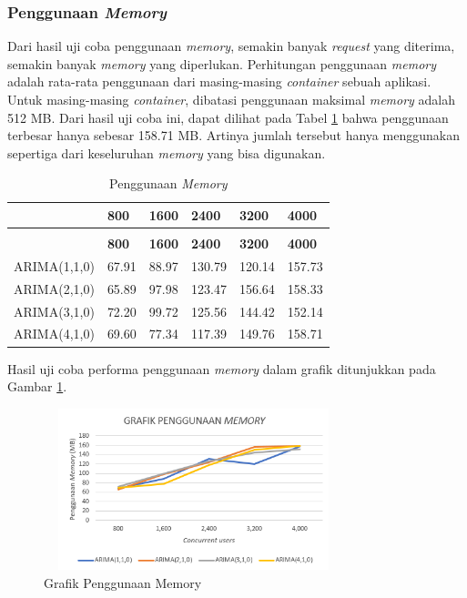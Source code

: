 \subsubsection{Penggunaan \textit{Memory}}            
Dari hasil uji coba penggunaan \textit{memory}, semakin banyak \textit{request} yang diterima, semakin banyak \textit{memory} yang diperlukan. Perhitungan penggunaan \textit{memory} adalah rata-rata penggunaan dari masing-masing \textit{container} sebuah aplikasi. Untuk masing-masing \textit{container}, dibatasi penggunaan maksimal \textit{memory} adalah 512 MB. Dari hasil uji coba ini, dapat dilihat pada Tabel \ref{penggunaanmemory} bahwa penggunaan terbesar hanya sebesar 158.71 MB. Artinya jumlah tersebut hanya menggunakan sepertiga dari keseluruhan \textit{memory} yang bisa digunakan.
\begin{longtable}{|p{}|p{}|p{}|p{}|p{}|p{}|}
	\caption{Penggunaan \textit{Memory}} \label{penggunaanmemory} \\
	\hline
	& \textbf{800} & \textbf{1600} & \textbf{2400} & \textbf{3200} & \textbf{4000} \\ \hline
	\endfirsthead
	\caption[]{Penggunaan \textit{Memory}} \\
	\hline
	& \textbf{800} & \textbf{1600} & \textbf{2400} & \textbf{3200} & \textbf{4000} \\ \hline
	\endhead
	\endfoot
	\endlastfoot
	
	ARIMA(1,1,0) & 67.91 & 88.97 & 130.79 & 120.14 & 157.73 \\ \hline
	ARIMA(2,1,0) & 65.89 & 97.98 & 123.47 & 156.64 & 158.33 \\ \hline
	ARIMA(3,1,0) & 72.20 & 99.72 & 125.56 & 144.42 & 152.14 \\ \hline
	ARIMA(4,1,0) & 69.60 & 77.34 & 117.39 & 149.76 & 158.71 \\ \hline
	
\end{longtable}

Hasil uji coba performa penggunaan \textit{memory} dalam grafik ditunjukkan pada Gambar \ref{gmemoryusage}.

\begin{figure}[H]
	\centering
	\includegraphics[width=8.7cm,height=4.7cm]{Images/C-5/memoryusage.png}
	\caption{Grafik Penggunaan Memory}
	\label{gmemoryusage}
\end{figure}


